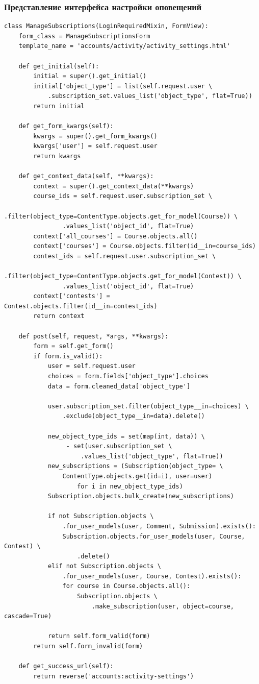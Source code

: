 \documentclass[12pt, a4paper, oneside]{article}
\begin{document}
\subsubsection{Представление интерфейса настройки оповещений}
\begin{verbatim}
class ManageSubscriptions(LoginRequiredMixin, FormView):
    form_class = ManageSubscriptionsForm
    template_name = 'accounts/activity/activity_settings.html'

    def get_initial(self):
        initial = super().get_initial()
        initial['object_type'] = list(self.request.user \
            .subscription_set.values_list('object_type', flat=True))
        return initial

    def get_form_kwargs(self):
        kwargs = super().get_form_kwargs()
        kwargs['user'] = self.request.user
        return kwargs

    def get_context_data(self, **kwargs):
        context = super().get_context_data(**kwargs)
        course_ids = self.request.user.subscription_set \
            .filter(object_type=ContentType.objects.get_for_model(Course)) \
                .values_list('object_id', flat=True)
        context['all_courses'] = Course.objects.all()
        context['courses'] = Course.objects.filter(id__in=course_ids)
        contest_ids = self.request.user.subscription_set \
            .filter(object_type=ContentType.objects.get_for_model(Contest)) \
                .values_list('object_id', flat=True)
        context['contests'] = Contest.objects.filter(id__in=contest_ids)
        return context

    def post(self, request, *args, **kwargs):
        form = self.get_form()
        if form.is_valid():
            user = self.request.user
            choices = form.fields['object_type'].choices
            data = form.cleaned_data['object_type']
            
            user.subscription_set.filter(object_type__in=choices) \
                .exclude(object_type__in=data).delete()
            
            new_object_type_ids = set(map(int, data)) \
                 - set(user.subscription_set \
                     .values_list('object_type', flat=True))
            new_subscriptions = (Subscription(object_type= \
                ContentType.objects.get(id=i), user=user) 
                    for i in new_object_type_ids)
            Subscription.objects.bulk_create(new_subscriptions)

            if not Subscription.objects \
                .for_user_models(user, Comment, Submission).exists():
                Subscription.objects.for_user_models(user, Course, Contest) \
                    .delete()
            elif not Subscription.objects \
                .for_user_models(user, Course, Contest).exists():
                for course in Course.objects.all():
                    Subscription.objects \
                        .make_subscription(user, object=course, cascade=True)

            return self.form_valid(form)
        return self.form_invalid(form)
    
    def get_success_url(self):
        return reverse('accounts:activity-settings')
\end{verbatim}
\end{document}
